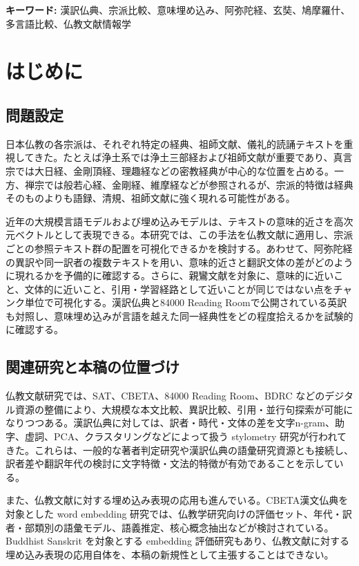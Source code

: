 \documentclass[uplatex,dvipdfmx,11pt,a4paper]{jsarticle}
\begin{document}
\noindent\textbf{キーワード:} 漢訳仏典、宗派比較、意味埋め込み、阿弥陀経、玄奘、鳩摩羅什、多言語比較、仏教文献情報学

\section{はじめに}

\subsection{問題設定}

日本仏教の各宗派は、それぞれ特定の経典、祖師文献、儀礼的読誦テキストを重視してきた。たとえば浄土系では浄土三部経および祖師文献が重要であり、真言宗では大日経、金剛頂経、理趣経などの密教経典が中心的な位置を占める。一方、禅宗では般若心経、金剛経、維摩経などが参照されるが、宗派的特徴は経典そのものよりも語録、清規、祖師文献に強く現れる可能性がある。

近年の大規模言語モデルおよび埋め込みモデルは、テキストの意味的近さを高次元ベクトルとして表現できる。本研究では、この手法を仏教文献に適用し、宗派ごとの参照テキスト群の配置を可視化できるかを検討する。あわせて、阿弥陀経の異訳や同一訳者の複数テキストを用い、意味的近さと翻訳文体の差がどのように現れるかを予備的に確認する。さらに、親鸞文献を対象に、意味的に近いこと、文体的に近いこと、引用・学習経路として近いことが同じではない点をチャンク単位で可視化する。漢訳仏典と84000 Reading Roomで公開されている英訳も対照し、意味埋め込みが言語を越えた同一経典性をどの程度拾えるかを試験的に確認する。

\subsection{関連研究と本稿の位置づけ}

仏教文献研究では、SAT、CBETA、84000 Reading Room、BDRC などのデジタル資源の整備により、大規模な本文比較、異訳比較、引用・並行句探索が可能になりつつある\cite{sat,cbeta,bdrc,84000-toh106}。漢訳仏典に対しては、訳者・時代・文体の差を文字n-gram、助字、虚詞、PCA、クラスタリングなどによって扱う stylometry 研究が行われてきた\cite{hung2010,bingenheimer2017}。これらは、一般的な著者判定研究\cite{burrows2002,koppel2009}や漢訳仏典の語彙研究資源\cite{karashima2001}とも接続し、訳者差や翻訳年代の検討に文字特徴・文法的特徴が有効であることを示している。

また、仏教文献に対する埋め込み表現の応用も進んでいる。CBETA漢文仏典を対象とした word embedding 研究では、仏教学研究向けの評価セット、年代・訳者・部類別の語彙モデル、語義推定、核心概念抽出などが検討されている\cite{huang2023}。Buddhist Sanskrit を対象とする embedding 評価研究もあり\cite{lugli2022}、仏教文献に対する埋め込み表現の応用自体を、本稿の新規性として主張することはできない。
\end{document}
